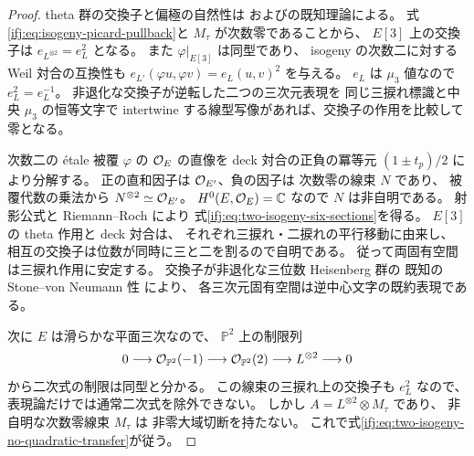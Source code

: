\begin{proof}
theta 群の交換子と偏極の自然性は
\cite[Definition~1.29 and Lemma~1.30]{NFMCremonaFisherDescentAlgebra}
および\cite[\S1]{MBPLMumfordTheta}の既知理論による。
式\eqref{ifj:eq:isogeny-picard-pullback}と
$M_\tau$ が次数零であることから、
$E[3]$ 上の交換子は
$e_{L^{\otimes2}}=e_L^2$ となる。
また $\varphi|_{E[3]}$ は同型であり、
isogeny の次数二に対する Weil 対合の互換性も
$e_{L'}(\varphi u,\varphi v)=e_L(u,v)^2$ を与える。
$e_L$ は $\mu_3$ 値なので $e_L^2=e_L^{-1}$。
非退化な交換子が逆転した二つの三次元表現を
同じ三捩れ標識と中央 $\mu_3$ の恒等文字で intertwine
する線型写像があれば、交換子の作用を比較して零となる。

次数二の \'{e}tale 被覆 $\varphi$ の
$\mathcal O_E$ の直像を deck 対合の正負の冪等元
$(1\pm t_p)/2$ により分解する。
正の直和因子は $\mathcal O_{E'}$、負の因子は
次数零の線束 $N$ であり、
被覆代数の乗法から $N^{\otimes2}\simeq\mathcal O_{E'}$。
$H^0(E,\mathcal O_E)=\mathbb C$ なので $N$ は非自明である。
射影公式と Riemann--Roch により
式\eqref{ifj:eq:two-isogeny-six-sections}を得る。
$E[3]$ の theta 作用と deck 対合は、
それぞれ三捩れ・二捩れの平行移動に由来し、
相互の交換子は位数が同時に三と二を割るので自明である。
従って両固有空間は三捩れ作用に安定する。
交換子が非退化な三位数 Heisenberg 群の
既知の Stone--von Neumann 性
\cite[\S1]{MBPLMumfordTheta}により、
各三次元固有空間は逆中心文字の既約表現である。

次に $E$ は滑らかな平面三次なので、
$\mathbb P^2$ 上の制限列
\[
 0\longrightarrow\mathcal O_{\mathbb P^2}(-1)
  \longrightarrow\mathcal O_{\mathbb P^2}(2)
  \longrightarrow L^{\otimes2}\longrightarrow0
\]
から二次式の制限は同型と分かる。
この線束の三捩れ上の交換子も $e_L^2$ なので、
表現論だけでは通常二次式を除外できない。
しかし $A=L^{\otimes2}\otimes M_\tau$ であり、
非自明な次数零線束 $M_\tau$ は
非零大域切断を持たない。
これで式\eqref{ifj:eq:two-isogeny-no-quadratic-transfer}が従う。
\end{proof}

